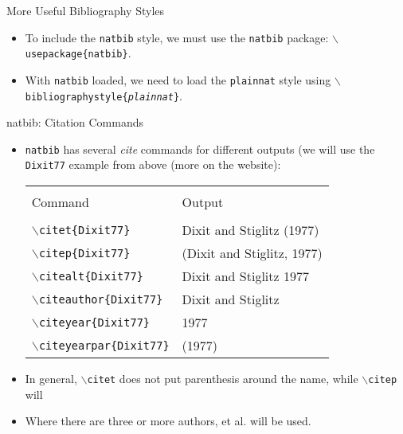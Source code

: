 \documentclass[pdf]{prosper}
\begin{document}
\begin{slide}{More Useful Bibliography Styles}
	\begin{itemize}
		\item To include the \texttt{natbib} style, we must use the \texttt{natbib} package: \texttt{$\backslash$usepackage\{natbib\}}.
		\item With \texttt{natbib} loaded, we need to load the \texttt{plainnat} style using \texttt{$\backslash$bibliographystyle\{\textit{plainnat}\}}.
	\end{itemize}
\end{slide}
\begin{slide}{natbib: Citation Commands}
	\begin{itemize}
		\item \texttt{natbib} has several \textit{cite} commands for different outputs (we will use the \texttt{Dixit77} example from above (more on the website):
			\begin{center}
				\begin{tabular}{l|l}
					\hline \\
					Command & Output \\
					\hline \\
					\texttt{$\backslash$citet\{Dixit77\}} & Dixit and Stiglitz (1977) \\
					\texttt{$\backslash$citep\{Dixit77\}} & (Dixit and Stiglitz, 1977) \\
					\texttt{$\backslash$citealt\{Dixit77\}} & Dixit and Stiglitz 1977 \\
					\texttt{$\backslash$citeauthor\{Dixit77\}} & Dixit and Stiglitz \\
					\texttt{$\backslash$citeyear\{Dixit77\}} & 1977 \\
					\texttt{$\backslash$citeyearpar\{Dixit77\}} & (1977) \\
				\end{tabular}
			\end{center}
		\item In general, \texttt{$\backslash$citet} does not put parenthesis around the name, while \texttt{$\backslash$citep} will
		\item Where there are three or more authors, et al. will be used.
	\end{itemize}
\end{slide}	
\end{document}
